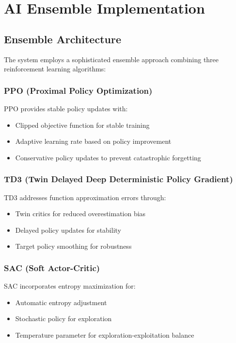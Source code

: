 \documentclass[11pt,a4paper]{article}
\begin{document}
\section{AI Ensemble Implementation}

\subsection{Ensemble Architecture}

The system employs a sophisticated ensemble approach combining three reinforcement learning algorithms:

\subsubsection{PPO (Proximal Policy Optimization)}
PPO provides stable policy updates with:
\begin{itemize}
    \item Clipped objective function for stable training
    \item Adaptive learning rate based on policy improvement
    \item Conservative policy updates to prevent catastrophic forgetting
\end{itemize}

\subsubsection{TD3 (Twin Delayed Deep Deterministic Policy Gradient)}
TD3 addresses function approximation errors through:
\begin{itemize}
    \item Twin critics for reduced overestimation bias
    \item Delayed policy updates for stability
    \item Target policy smoothing for robustness
\end{itemize}

\subsubsection{SAC (Soft Actor-Critic)}
SAC incorporates entropy maximization for:
\begin{itemize}
    \item Automatic entropy adjustment
    \item Stochastic policy for exploration
    \item Temperature parameter for exploration-exploitation balance
\end{itemize}
\end{document}
